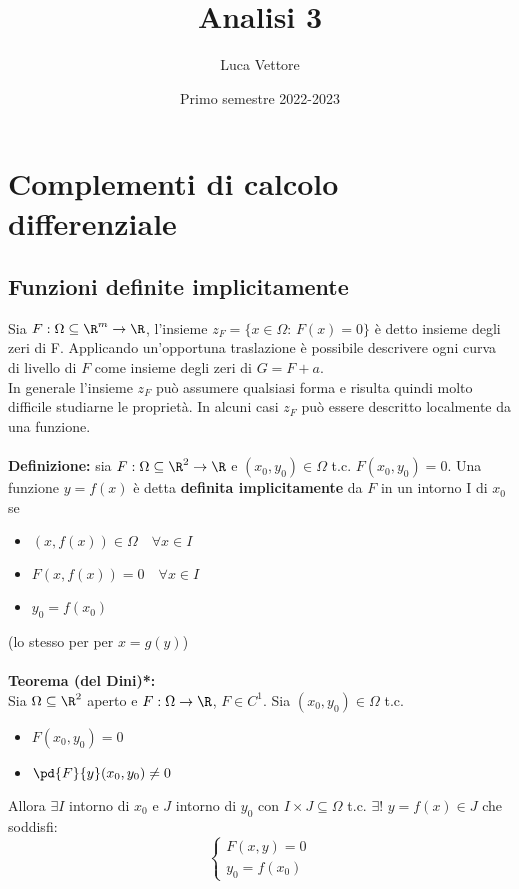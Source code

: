 \documentclass{article}
\title{Analisi 3}
\author{Luca Vettore}
\date{Primo semestre 2022-2023}
\begin{document}


\maketitle

\section{Complementi di calcolo differenziale}

\subsection{Funzioni definite implicitamente}
Sia $F:\Omega\subseteq\R^m\rightarrow\R$, l'insieme $z_F=\{x\in\Omega:\, F(x)=0\}$ è detto insieme degli zeri di F. 
Applicando un'opportuna traslazione è possibile descrivere ogni curva di livello di $F$ come insieme degli zeri di $G=F+a$.\\
In generale l'insieme $z_F$ può assumere qualsiasi forma e risulta quindi molto difficile studiarne le proprietà. In alcuni casi $z_F$ può essere descritto localmente da una funzione.\\\\
\textbf{Definizione:} sia $F:\Omega\subseteq\R^2\rightarrow\R$ e $(x_0,y_0)\in\Omega$ t.c. $F(x_0,y_0)=0$. Una funzione $y=f(x)$ è detta \textbf{definita implicitamente} da $F$ in un intorno I di $x_0$ se
\begin{itemize}
    \item $(x,f(x))\in\Omega\quad\forall x\in I$
    \item $F(x,f(x))=0\quad\forall x\in I$
    \item $y_0=f(x_0)$
\end{itemize}
(lo stesso per per $x=g(y)$)\\\\
\textbf{Teorema (del Dini)*:}\\
Sia $\Omega\subseteq\R^2$ aperto e $F:\Omega\rightarrow\R$, $F\in C^1$. Sia $(x_0,y_0)\in\Omega$ t.c.
\begin{itemize}
    \item $F(x_0,y_0)=0$
    \item $\pd{F}{y}(x_0,y_0)\neq0$
\end{itemize}
Allora $\exists I$ intorno di $x_0$ e $J$ intorno di $y_0$ con $I\times J\subseteq\Omega$ t.c. $\exists!$ $y=f(x)\in J$ che soddisfi:
\begin{equation*}
    \begin{cases}
    F(x,y)=0\\
    y_0=f(x_0)
    \end{cases}
\end{equation*}
\end{document}
